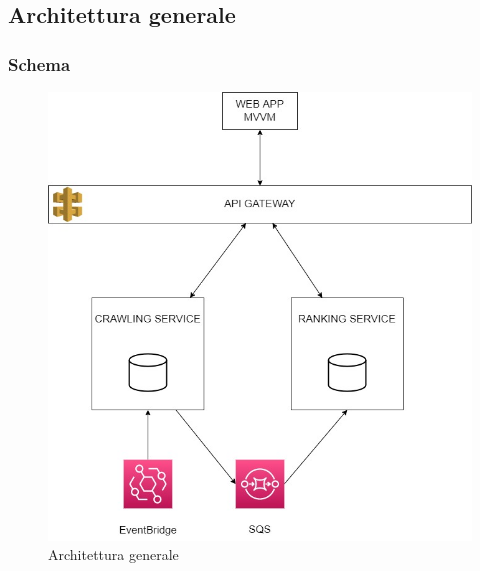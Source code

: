 \subsection{Architettura generale}

\subsubsection{Schema}
\begin{figure}[H]
    \centerfloat
    \includegraphics[scale=0.35]{Contenuto/Immagini/backend-architettura.jpg}
    \caption{Architettura generale}
\end{figure}

